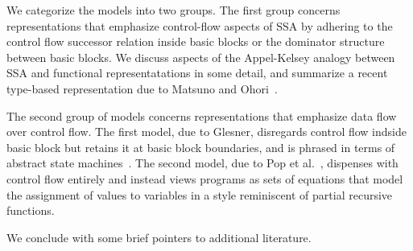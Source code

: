 We categorize the models into two groups. The first group concerns
representations that emphasize control-flow aspects of SSA by adhering
to the control flow successor relation inside basic blocks or the
dominator structure between basic blocks. We discuss aspects of the
Appel-Kelsey analogy between SSA and functional representatations in
some detail, and summarize a recent type-based representation due to
Matsuno and Ohori~\cite{DBLP:conf/ppdp/MatsunoO06}.

The second group of models concerns representations that emphasize
data flow over control flow. The first model, due to Glesner,
disregards control flow indside basic block but retains it at basic
block boundaries, and is phrased in terms of abstract state
machines~\cite{DBLP:journals/tocl/Gurevich00}.  The second model, due
to Pop et al.~\cite{PopJS2007}, dispenses with control flow entirely
and instead views programs as sets of equations that model the
assignment of values to variables in a style reminiscent of partial
recursive functions.

We conclude with some brief pointers to additional literature.

